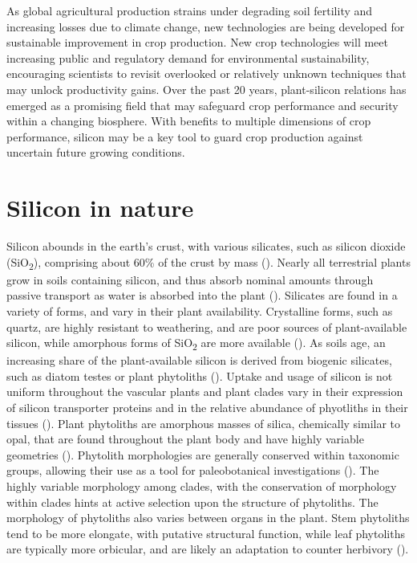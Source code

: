 \documentclass[12pt, letterpaper, ]{report}
\begin{document}
As global agricultural production strains under degrading soil fertility and increasing losses due to climate change, new technologies are being developed for sustainable improvement in crop production. New crop technologies will meet increasing public and regulatory demand for environmental sustainability, encouraging scientists to revisit overlooked or relatively unknown techniques that may unlock productivity gains. Over the past 20 years, plant-silicon relations has emerged as a promising field that may safeguard crop performance and security within a changing biosphere. With benefits to multiple dimensions of crop performance, silicon may be a key tool to guard crop production against uncertain future growing conditions. 

\section{Silicon in nature}

Silicon abounds in the earth’s crust, with various silicates, such as silicon dioxide (SiO\textsubscript{2}), comprising about 60\% of the crust by mass (\cite{holland_41_2014}). Nearly all terrestrial plants grow in soils containing silicon, and thus absorb nominal amounts through passive transport as water is absorbed into the plant (\cite{debona_silicons_2017}). Silicates are found in a variety of forms, and vary in their plant availability. Crystalline forms, such as quartz, are highly resistant to weathering, and are poor sources of plant-available silicon, while amorphous forms of SiO\textsubscript{2} are more available (\cite{fraysse_surface_2009}). As soils age, an increasing share of the plant-available silicon is derived from biogenic silicates, such as diatom testes or plant phytoliths (\cite{de_tombeur_plants_2020}). Uptake and usage of silicon is not uniform throughout the vascular plants and plant clades vary in their expression of silicon transporter proteins and in the relative abundance of phyotliths in their tissues (\cite{ma_chapter_2001}). Plant phytoliths are amorphous masses of silica, chemically similar to opal, that are found throughout the plant body and have highly variable geometries (\cite{piperno_phytoliths_2006}). Phytolith morphologies are generally conserved within taxonomic groups, allowing their use as a tool for paleobotanical investigations (\cite{piperno_phytoliths_2006}). The highly variable morphology among clades, with the conservation of morphology within clades hints at active selection upon the structure of phytoliths. The morphology of phytoliths also varies between organs in the plant. Stem phytoliths tend to be more elongate, with putative structural function, while leaf phytoliths are typically more orbicular, and are likely an adaptation to counter herbivory (\cite{parr_phytolith_2011}).
\end{document}
